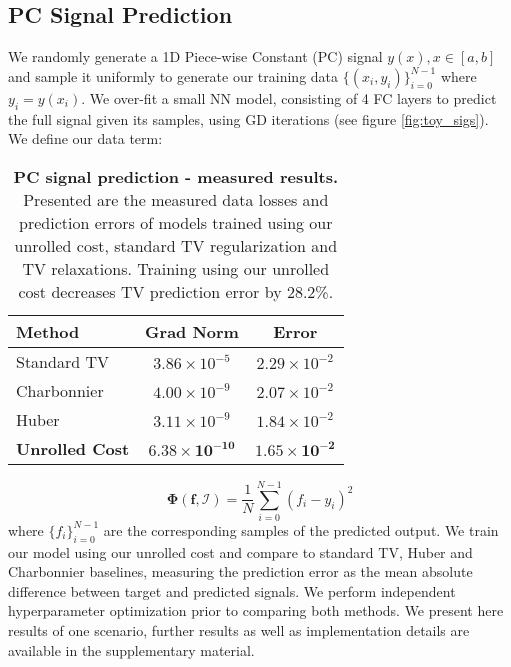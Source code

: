 \documentclass[10pt,twocolumn,letterpaper]{article}
\begin{document}
\subsection{PC Signal Prediction} \label{sec:synthtetic}
We randomly generate a 1D Piece-wise Constant (PC) signal $y(x),x\in[a,b]$ and sample it uniformly to generate our training data $\{(x_i,y_i)\}_{i=0}^{N-1}$ where $y_i=y(x_i)$. We over-fit a small NN model, consisting of 4 FC layers to predict the full signal given its samples, using GD iterations (see figure \ref{fig:toy_sigs}). We define our data term:
\begin{table}
\begin{center}
\begin{tabular}{l c c} 
    \toprule
    \textbf{Method} & \textbf{Grad Norm} & \textbf{Error} \\
    \midrule
    Standard TV     & $3.86\times10^{-5}$   & $2.29\times10^{-2}$\\
    Charbonnier \cite{charbonnier1997deterministic}    & $4.00\times10^{-9}$   & $2.07\times10^{-2}$\\
    Huber \cite{huber1964robust}           & $3.11\times10^{-9}$   & $1.84\times10^{-2}$\\    
    \textbf{Unrolled Cost}   & $\mathbf{6.38\times10^{-10}}$   & $\mathbf{1.65\times10^{-2}}$\\
    \bottomrule
\end{tabular}
\end{center}
\caption{\textbf{PC signal prediction - measured results.} Presented are the measured data losses and prediction errors of models trained using our unrolled cost, standard TV regularization and TV relaxations. Training using our unrolled cost decreases TV prediction error by 28.2\%.}
\label{ta:toy}
\end{table} \begin{equation}
    \mathbf{\Phi}\left( \mathbf{f},\mathcal{I} \right)=\frac{1}{N}\sum_{i=0}^{N-1} \left(f_i - y_i\right)^2
\label{eq:toy_data}
\end{equation}
where $\{f_i\}_{i=0}^{N-1}$ are the corresponding samples of the predicted output. We train our model using our unrolled cost and compare to standard TV, Huber \cite{huber1964robust} and Charbonnier \nolinebreak \cite{charbonnier1997deterministic} baselines, measuring the prediction error as the mean absolute difference between target and predicted signals. We perform independent hyperparameter optimization prior to comparing both methods. 
We present here results of one scenario, further results as well as implementation details are available in the supplementary material. 
\end{document}
